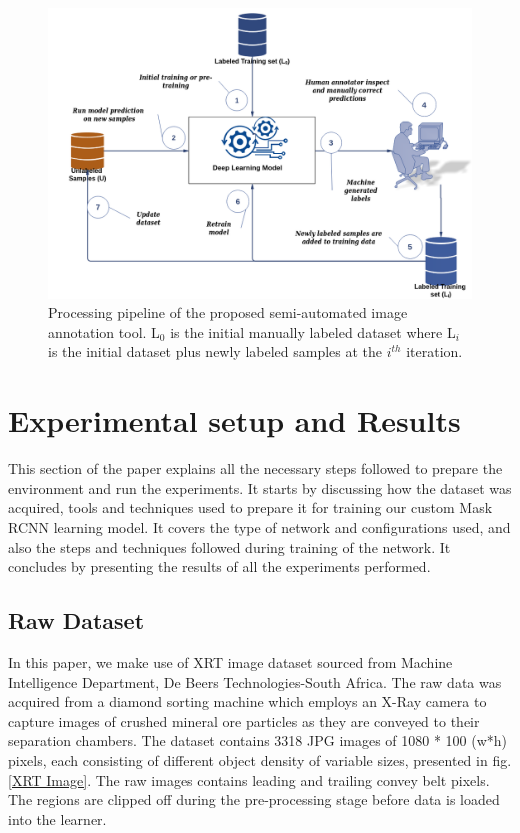 \documentclass[conference]{IEEEtran}
\begin{document}
		\begin{figure}[htbp]
			\centerline{\includegraphics[width=1\linewidth]{Semi-automated IA pipeline2.png}}
			\caption{Processing pipeline of the proposed semi-automated image annotation tool. L$ _{0} $
 is the initial manually labeled dataset where L$ _{i} $
is the initial dataset plus newly labeled
samples at the $ i^{th} $ iteration.}
			\label{fig1}
		\end{figure}		
		
\section{Experimental setup and Results}
	This section of the paper explains all the necessary steps followed to prepare the environment and run the experiments. It starts by discussing how the dataset was acquired, tools and
techniques used to prepare it for training our custom Mask RCNN learning model. It covers
the type of network and configurations used, and also the steps and techniques followed
during training of the network. It concludes by presenting the results of all the experiments performed.
	
	\subsection{Raw Dataset}
	
		In this paper, we make use of XRT image dataset sourced from Machine Intelligence
Department, De Beers Technologies-South Africa. The raw data was acquired from a
diamond sorting machine which employs an X-Ray camera to capture images of crushed mineral ore particles as they are conveyed to their separation chambers. The dataset contains 3318 JPG images of 1080 * 100 (w*h) pixels, each consisting
of different object density of variable sizes, presented in fig. \ref{XRT Image}. The raw images contains leading and trailing convey belt pixels. The regions are clipped off during the pre-processing stage before data is loaded into the learner.
\end{document}

